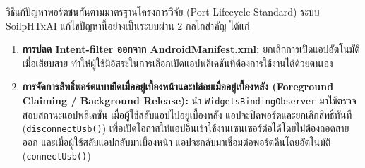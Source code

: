 \begin{academicbox}{วิธีแก้ปัญหาพอร์ตชนกันตามมาตรฐานโครงการวิจัย (Port Lifecycle Standard)}
ระบบ SoilpHTxAI แก้ไขปัญหานี้อย่างเป็นระบบผ่าน 2 กลไกสำคัญ ได้แก่
\begin{enumerate}
    \item \textbf{การปลด Intent-filter ออกจาก AndroidManifest.xml:} ยกเลิกการเปิดแอปอัตโนมัติเมื่อเสียบสาย ทำให้ผู้ใช้มีอิสระในการเลือกเปิดแอปพลิเคชันที่ต้องการใช้งานได้ด้วยตนเอง
    \item \textbf{การจัดการสิทธิ์พอร์ตแบบยึดเมื่ออยู่เบื้องหน้าและปล่อยเมื่ออยู่เบื้องหลัง (Foreground Claiming / Background Release):} นำ \texttt{WidgetsBindingObserver} มาใช้ตรวจสอบสถานะแอปพลิเคชัน เมื่อผู้ใช้สลับแอปไปอยู่เบื้องหลัง แอปจะปิดพอร์ตและยกเลิกสิทธิ์ทันที (\texttt{disconnectUsb()}) เพื่อเปิดโอกาสให้แอปอื่นเข้าใช้งานเซนเซอร์ต่อได้โดยไม่ต้องถอดสายออก และเมื่อผู้ใช้สลับแอปกลับมาเบื้องหน้า แอปจะกลับมาเชื่อมต่อพอร์ตคืนโดยอัตโนมัติ (\texttt{connectUsb()})
\end{enumerate}
\end{academicbox}

\clearpage
